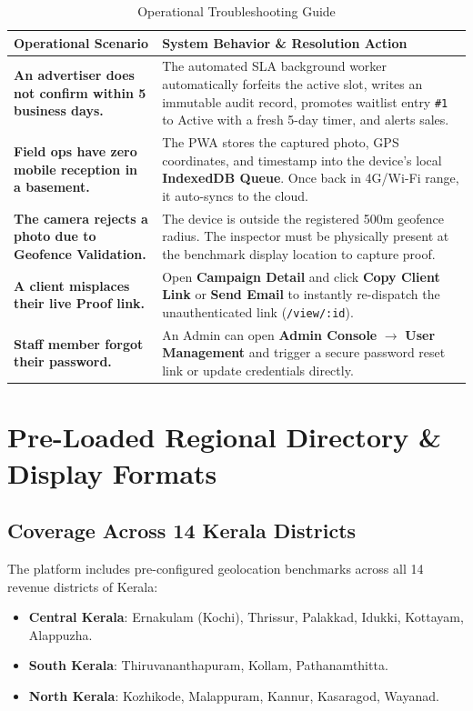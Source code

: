 \documentclass[11pt,a4paper]{article}
\begin{document}
\begin{table}[h!]
\centering
\small
\renewcommand{\arraystretch}{1.35}
\begin{tabularx}{\textwidth}{p{4.5cm} X}
\toprule
\textbf{Operational Scenario} & \textbf{System Behavior \& Resolution Action} \\
\midrule
\textbf{An advertiser does not confirm within 5 business days.} & The automated SLA background worker automatically forfeits the active slot, writes an immutable audit record, promotes waitlist entry \texttt{\#1} to Active with a fresh 5-day timer, and alerts sales. \\
\addlinespace
\textbf{Field ops have zero mobile reception in a basement.} & The PWA stores the captured photo, GPS coordinates, and timestamp into the device's local \textbf{IndexedDB Queue}. Once back in 4G/Wi-Fi range, it auto-syncs to the cloud. \\
\addlinespace
\textbf{The camera rejects a photo due to Geofence Validation.} & The device is outside the registered 500m geofence radius. The inspector must be physically present at the benchmark display location to capture proof. \\
\addlinespace
\textbf{A client misplaces their live Proof link.} & Open \textbf{Campaign Detail} and click \textbf{Copy Client Link} or \textbf{Send Email} to instantly re-dispatch the unauthenticated link (\texttt{/view/:id}). \\
\addlinespace
\textbf{Staff member forgot their password.} & An Admin can open \textbf{Admin Console} $\rightarrow$ \textbf{User Management} and trigger a secure password reset link or update credentials directly. \\
\bottomrule
\end{tabularx}
\caption{Operational Troubleshooting Guide}
\end{table}

\newpage

\section{Pre-Loaded Regional Directory \& Display Formats}

\subsection{Coverage Across 14 Kerala Districts}
The platform includes pre-configured geolocation benchmarks across all 14 revenue districts of Kerala:
\begin{itemize}[leftmargin=1.5em, itemsep=2pt]
    \item \textbf{Central Kerala}: Ernakulam (Kochi), Thrissur, Palakkad, Idukki, Kottayam, Alappuzha.
    \item \textbf{South Kerala}: Thiruvananthapuram, Kollam, Pathanamthitta.
    \item \textbf{North Kerala}: Kozhikode, Malappuram, Kannur, Kasaragod, Wayanad.
\end{itemize}
\end{document}
